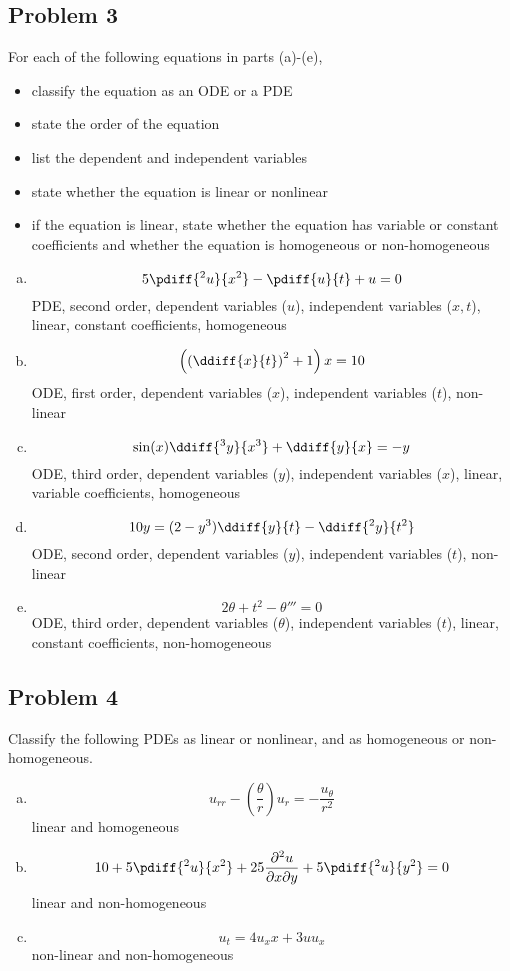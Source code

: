 \documentclass{math}
\begin{document}
\subsection*{Problem 3}
For each of the following equations in parts (a)-(e),
\begin{itemize}
  \item classify the equation as an ODE or a PDE
  \item state the order of the equation
  \item list the dependent and independent variables
  \item state whether the equation is linear or nonlinear
  \item if the equation is linear, state whether the equation has variable or
    constant coefficients and whether the equation is homogeneous or
    non-homogeneous
\end{itemize}
\begin{enumerate}[(a)]
  \item \[ 5\pdiff{^2u}{x^2}-\pdiff{u}{t}+u = 0 \]
    PDE, second order, dependent variables (\( u \)), independent variables
    (\( x, t \)), linear, constant coefficients, homogeneous
  \item \[ \left(\left(\ddiff{x}{t}\right)^2+1\right)x = 10 \]
    ODE, first order, dependent variables (\( x \)), independent variables
    (\( t \)), non-linear
  \item \[ \sin(x)\ddiff{^3y}{x^3}+\ddiff{y}{x} = -y \]
    ODE, third order, dependent variables (\( y \)), independent variables
    (\( x \)), linear, variable coefficients, homogeneous
  \item \[ 10y = (2-y^3)\ddiff{y}{t}-\ddiff{^2y}{t^2} \]
    ODE, second order, dependent variables (\( y \)), independent variables
    (\( t \)), non-linear
  \item \[ 2\theta+t^2-\theta''' = 0 \]
    ODE, third order, dependent variables (\( \theta \)), independent variables
    (\( t \)), linear, constant coefficients, non-homogeneous
\end{enumerate}

\subsection*{Problem 4}
Classify the following PDEs as linear or nonlinear, and as homogeneous or
non-homogeneous.
\begin{enumerate}[(a)]
  \item \[ u_{rr}-(\frac{\theta}{r})u_r = -\frac{u_{\theta}}{r^2} \]
  linear and homogeneous
  \item \[ 10+5\pdiff{^2u}{x^2}+25\frac{\partial^2u}{\partial x\partial y}+
    5\pdiff{^2u}{y^2} = 0 \]
    linear and non-homogeneous
  \item \[ u_t = 4u_xx+3uu_x \]
    non-linear and non-homogeneous
\end{enumerate}
\end{document}
